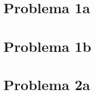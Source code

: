 \documentclass[10pt,spanish,letterpaper]{article}
\begin{document}
  \thispagestyle{empty}

  \section*{Problema 1a}
  
  

  \section*{Problema 1b}
  
  

  \section*{Problema 2a}
  
  
  
  
\end{document}
